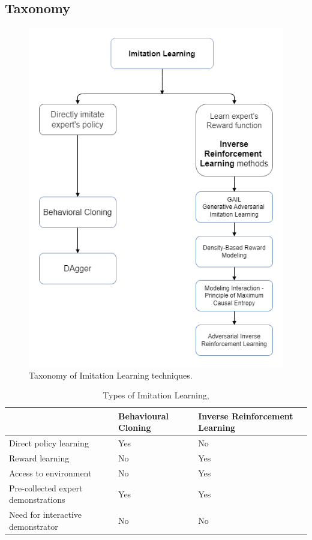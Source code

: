 \documentclass{article}
\begin{document}
\subsection{Taxonomy}\label{sec:Taxonomy}

\begin{figure}[H]
	\centering
	\includegraphics[width=0.4\linewidth]{images/IRL_Taxonomy.png}
	\caption{Taxonomy of Imitation Learning techniques.}
	\label{fig:taxonomy}
\end{figure}

\begingroup
\setlength{\tabcolsep}{6pt}
\begin{table}[h!]
	\centering
	\renewcommand{\arraystretch}{1.5} 
	\begin{tabular}{L{6cm} L{3cm} L{3cm}}
		\midrule[0.01pt]
		& \textbf{Behavioural Cloning} & \textbf{Inverse Reinforcement Learning}\\
		\midrule[0.01pt]
		Direct policy learning & Yes & No \\
		Reward learning & No & Yes \\
		Access to environment & No & Yes \\
		Pre-collected expert demonstrations & Yes & Yes \\
		Need for interactive demonstrator & No & No \\
		\midrule[0.01pt]
	\end{tabular}
	\caption{Types of Imitation Learning, \cite{yue2018imitation}}
	\label{tbl:BC_IRL}
\end{table}
\endgroup
\end{document}
